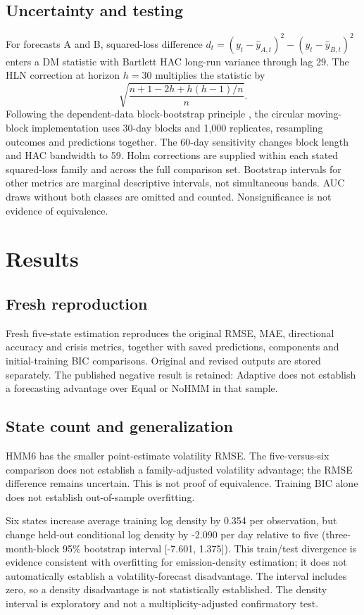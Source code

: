 \documentclass[11pt]{article}
\begin{document}
\subsection{Uncertainty and testing}
For forecasts A and B, squared-loss difference $d_t=(y_t-\hat y_{A,t})^2-(y_t-\hat y_{B,t})^2$
enters a DM statistic with Bartlett HAC long-run variance through lag 29. The HLN correction at
horizon $h=30$ multiplies the statistic by
\begin{equation}
\sqrt{\frac{n+1-2h+h(h-1)/n}{n}}.
\end{equation}
Following the dependent-data block-bootstrap principle \citep{kunsch}, the circular moving-block
implementation uses 30-day blocks and 1,000 replicates, resampling outcomes
and predictions together. The 60-day sensitivity changes block length and HAC bandwidth to 59.
Holm corrections \citep{holm} are supplied within each stated squared-loss family and across the full comparison
set. Bootstrap intervals for other metrics are marginal descriptive intervals, not simultaneous bands.
AUC draws without both classes are omitted and counted. Nonsignificance is not evidence of equivalence.

\section{Results}
\subsection{Fresh reproduction}

Fresh five-state estimation reproduces the original RMSE, MAE, directional accuracy and crisis
metrics, together with saved predictions, components and initial-training BIC comparisons.
Original and revised outputs are stored separately. The published negative result is retained:
Adaptive does not establish a forecasting advantage over Equal or NoHMM in that sample.

\subsection{State count and generalization}


HMM6 has the smaller point-estimate volatility RMSE. The five-versus-six comparison does not establish a family-adjusted volatility advantage; the RMSE difference remains uncertain. This is not proof of equivalence. Training BIC alone does not establish out-of-sample overfitting.

Six states increase average training log density by 0.354 per observation, but change held-out conditional log density by -2.090 per day relative to five (three-month-block 95\% bootstrap interval [-7.601, 1.375]). This train/test divergence is evidence consistent with overfitting for emission-density estimation; it does not automatically establish a volatility-forecast disadvantage. The interval includes zero, so a density disadvantage is not statistically established. The density interval is exploratory and not a multiplicity-adjusted confirmatory test.
\end{document}
